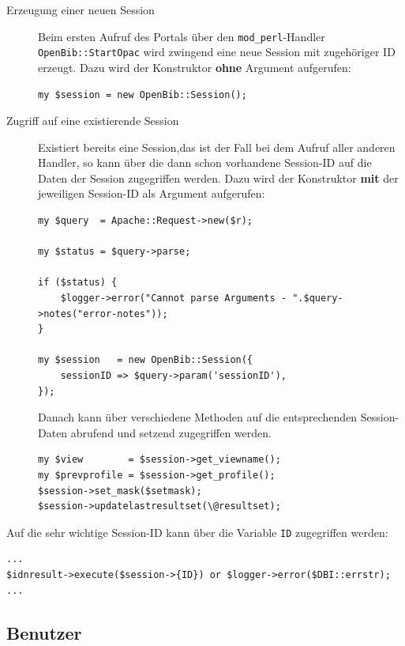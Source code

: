 \documentclass[11pt, twoside, a4paper, BCOR8mm, DIV12, bibtotoc,idxtotoc]{scrbook}
\begin{document}
\begin{description}
\item[Erzeugung einer neuen Session] Beim ersten Aufruf des Portals
  über den \texttt{mod\_perl}-Handler \texttt{OpenBib::StartOpac} wird
  zwingend eine neue Session mit zugehöriger ID erzeugt. Dazu wird der
  Konstruktor \textbf{ohne} Argument aufgerufen:

\begin{verbatim}
my $session = new OpenBib::Session();
\end{verbatim}

\item[Zugriff auf eine existierende Session] Existiert bereits eine
  Session,das ist der Fall bei dem Aufruf aller anderen Handler, so
  kann über die dann schon vorhandene Session-ID auf die Daten der
  Session zugegriffen werden. Dazu wird der Konstruktor \textbf{mit}
  der jeweiligen Session-ID als Argument aufgerufen:

\begin{verbatim}
my $query  = Apache::Request->new($r);

my $status = $query->parse;

if ($status) {
    $logger->error("Cannot parse Arguments - ".$query->notes("error-notes"));
}

my $session   = new OpenBib::Session({
    sessionID => $query->param('sessionID'),
});
\end{verbatim}

Danach kann über verschiedene Methoden auf die entsprechenden
Session-Daten abrufend und setzend zugegriffen werden.

\begin{verbatim}
my $view        = $session->get_viewname();
my $prevprofile = $session->get_profile();
$session->set_mask($setmask);
$session->updatelastresultset(\@resultset);
\end{verbatim}
\end{description}

Auf die sehr wichtige Session-ID kann über die Variable \texttt{ID}
zugegriffen werden:

\begin{verbatim}
...
$idnresult->execute($session->{ID}) or $logger->error($DBI::errstr);
...
\end{verbatim}


\subsection{Benutzer}
\end{document}
